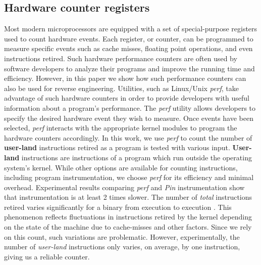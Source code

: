 \documentclass{sig-alternate-05-2015}
\begin{document}
\subsection{Hardware counter registers} \label{bg_hardwarereg}
Most modern microprocessors are equipped with a set of special-purpose registers used to count hardware events.
Each register, or counter, can be programmed to measure specific events such as cache misses, floating point operations, and even instructions retired.
Such hardware performance counters are often used by software developers to analyze their programs and improve the running time and efficiency.
However, in this paper we show how such performance counters can also be used for reverse engineering.
Utilities, such as Linux/Unix \textit{perf}, take advantage of such hardware counters in order to provide developers with useful information about a program's performance.
The \textit{perf} utility allows developers to specify the desired hardware event they wish to measure.
Once events have been selected, \textit{perf} interacts with the appropriate kernel modules to program the hardware counters accordingly.
In this work, we use \textit{perf} to count the number of \textbf{user-land} instructions retired as a program is tested with various input.
\textbf{User-land} instructions are instructions of a program which run outside the operating system's kernel.
While other options are available for counting instructions, including program instrumentation, we choose \textit{perf} for its efficiency and minimal overhead.
Experimental results comparing \textit{perf} and \textit{Pin} instrumentation show that instrumentation is at least 2 times slower.
The number of \textit{total} instructions retired varies significantly for a binary from execution to execution \cite{weaver2008can}.
This phenomenon reflects fluctuations in instructions retired by the kernel depending on the state of the machine due to cache-misses and other factors.
Since we rely on this count, such variations are problematic.
However, experimentally, the number of \textit{user-land} instructions only varies, on average, by one instruction, giving us a reliable counter.
\end{document}
